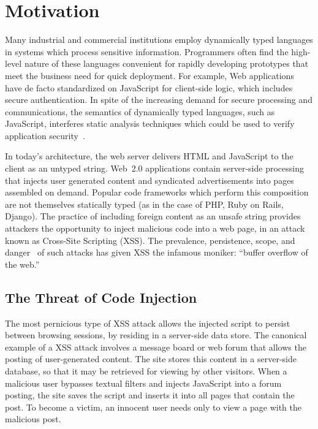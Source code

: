 
\chapter{Motivation}
\label{ch:motivation}

Many industrial and commercial institutions employ dynamically typed languages in systems which process sensitive information.
Programmers often find the high-level nature of these languages convenient for rapidly developing prototypes that meet the business need for quick deployment.
For example, Web applications have de facto standardized on JavaScript for client-side logic, which includes secure authentication.
In spite of the increasing demand for secure processing and communications, the semantics of dynamically typed languages, such as JavaScript, interferes static analysis techniques which could be used to verify application security~\cite{static-typing}.

In today's architecture, the web server delivers HTML and JavaScript to the client as an untyped string.
Web~2.0 applications contain server-side processing that injects user generated content and syndicated advertisements into pages assembled on demand.
Popular code frameworks which perform this composition are not themselves statically typed (as in the case of PHP, Ruby on Rails, Django).
The practice of including foreign content as an unsafe string provides attackers the opportunity to inject malicious code into a web page, in an attack known as Cross-Site Scripting (XSS).
The prevalence, persistence, scope, and danger~\cite{whitehat, mitre} of such attacks has given XSS the infamous moniker: ``buffer overflow of the web.''

\section{The Threat of Code Injection}

The most pernicious type of XSS attack allows the injected script to persist between browsing sessions, by residing in a server-side data store.
The canonical example of a  XSS attack involves a message board or web forum that allows the posting of user-generated content.
The site stores this content in a server-side database, so that it may be retrieved for viewing by other visitors.
When a malicious user bypasses textual filters and injects JavaScript into a forum posting, the site saves the script and inserts it into all pages that contain the post.
To become a victim, an innocent user needs only to view a page with the malicious post.

